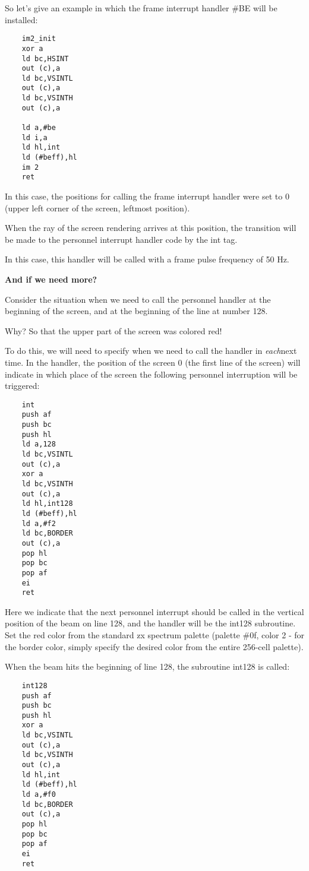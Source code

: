 \documentclass{article}
\begin{document}
So let's give an example in which the frame interrupt handler \#BE
will be installed:

\begin{verbatim}
    im2_init
    xor a
    ld bc,HSINT
    out (c),a
    ld bc,VSINTL
    out (c),a
    ld bc,VSINTH
    out (c),a

    ld a,#be
    ld i,a
    ld hl,int
    ld (#beff),hl
    im 2
    ret
\end{verbatim}

In this case, the positions for calling the frame interrupt handler
were set to 0 (upper left corner of the screen, leftmost position).

When the ray of the screen rendering arrives at this position, the
transition will be made to the personnel interrupt handler code by the
int tag.

In this case, this handler will be called with a frame pulse frequency
of 50 Hz.

\textbf{And if we need more? }

Consider the situation when we need to call the personnel handler at
the beginning of the screen, and at the beginning of the line at
number 128.

Why? So that the upper part of the screen was colored red!

To do this, we will need to specify when we need to call the handler
in \emph{each}next time. In the handler, the position of the screen 0
(the first line of the screen) will indicate in which place of the
screen the following personnel interruption will be triggered:

\begin{verbatim}
    int
    push af
    push bc
    push hl
    ld a,128
    ld bc,VSINTL
    out (c),a
    xor a
    ld bc,VSINTH
    out (c),a
    ld hl,int128
    ld (#beff),hl
    ld a,#f2
    ld bc,BORDER
    out (c),a
    pop hl
    pop bc
    pop af
    ei
    ret
\end{verbatim}

Here we indicate that the next personnel interrupt should be called in
the vertical position of the beam on line 128, and the handler will be
the int128 subroutine. Set the red color from the standard zx spectrum
palette (palette \#0f, color 2 - for the border color, simply specify
the desired color from the entire 256-cell palette).

When the beam hits the beginning of line 128, the subroutine int128 is
called:

\begin{verbatim}
    int128
    push af
    push bc
    push hl
    xor a
    ld bc,VSINTL
    out (c),a
    ld bc,VSINTH
    out (c),a
    ld hl,int
    ld (#beff),hl
    ld a,#f0
    ld bc,BORDER
    out (c),a
    pop hl
    pop bc
    pop af
    ei
    ret
\end{verbatim}
\end{document}
